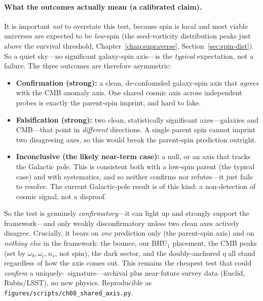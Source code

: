 \paragraph{What the outcomes actually mean (a calibrated claim).} It is important
\emph{not} to overstate this test, because spin is local and most viable universes are
expected to be \emph{low}-spin (the seed-vorticity distribution peaks just above the
survival threshold, Chapter~\ref{chap:supraverse}, Section~\ref{sec:spin-dist}). So a
quiet sky---no significant galaxy-spin axis---is the \emph{typical} expectation, not a
failure. The three outcomes are therefore asymmetric:
\begin{itemize}
  \item \textbf{Confirmation (strong):} a clean, de-confounded galaxy-spin axis that
    \emph{agrees} with the CMB anomaly axis. One shared cosmic axis across independent
    probes is exactly the parent-spin imprint, and hard to fake.
  \item \textbf{Falsification (strong):} two clean, statistically significant
    axes---galaxies and CMB---that point in \emph{different} directions. A single
    parent spin cannot imprint two disagreeing axes, so this would break the
    parent-spin prediction outright.
  \item \textbf{Inconclusive (the likely near-term case):} a null, or an axis that
    tracks the Galactic pole. This is consistent both with a low-spin parent (the
    typical case) and with systematics, and so neither confirms nor refutes---it just
    fails to resolve. The current Galactic-pole result is of this kind: a non-detection
    of cosmic signal, not a disproof.
\end{itemize}
So the test is genuinely \emph{confirmatory}---it can light up and strongly support
the framework---and only weakly disconfirmatory unless two clean axes actively
disagree. Crucially, it bears on \emph{one} prediction only (the parent-spin axis) and
on \emph{nothing else} in the framework: the bounce, our $\mathrm{BHU}_1$ placement,
the CMB peaks (set by $\omega_b,\omega_c,n_s$, not spin), the dark sector, and the
doubly-anchored $\eta$ all stand regardless of how the axis comes out. This remains the
cheapest test that could \emph{confirm} a uniquely-\SCT\ signature---archival plus
near-future survey data (Euclid, Rubin/LSST), no new physics. Reproducible as
\texttt{figures/scripts/ch08\_shared\_axis.py}.

